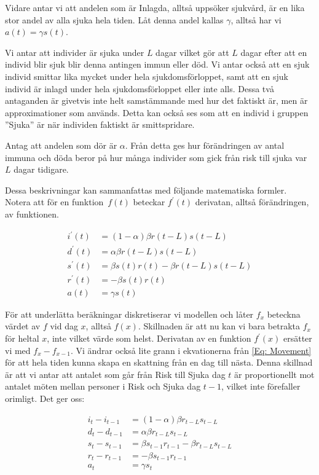 \documentclass[a4paper, 12pt]{article}
\theoremstyle{definition}
\begin{document}
Vidare antar vi att andelen som är Inlagda, alltså uppsöker sjukvård, är en lika stor andel av alla sjuka hela tiden. Låt denna andel kallas $\gamma$, alltså har vi $a(t)=\gamma s(t)$.

Vi antar att individer är sjuka under $L$ dagar vilket gör att $L$ dagar efter att en individ blir sjuk blir denna antingen immun eller död. Vi antar också att en sjuk individ smittar lika mycket under hela sjukdomsförloppet, samt att en sjuk individ är inlagd under hela sjukdomsförloppet eller inte alls. Dessa två antaganden är givetvis inte helt samstämmande med hur det faktiskt är, men är approximationer som används. Detta kan också ses som att en individ i gruppen ''Sjuka'' är när individen faktiskt är smittspridare.

Antag att andelen som dör är $\alpha$. Från detta ges hur förändringen av antal immuna och döda beror på hur många individer som gick från risk till sjuka var $L$ dagar tidigare.

Dessa beskrivningar kan sammanfattas med följande matematiska formler. Notera att för en funktion $f(t)$ beteckar $f^\prime(t)$ derivatan, alltså förändringen, av funktionen.

\begin{align}\label{Eq: Movement}
  i^\prime(t) &= (1-\alpha)\beta r(t-L)s(t-L) \\
  d^\prime(t) &= \alpha\beta r(t-L)s(t-L) \\
  s^\prime(t) &= \beta s(t)r(t) - \beta r(t-L)s(t-L) \\
  r^\prime(t) &= -\beta s(t)r(t)\\
  a(t) &= \gamma s(t)
\end{align}

För att underlätta beräkningar diskretiserar vi modellen och låter $f_x$ beteckna värdet av $f$ vid dag $x$, alltså $f(x)$. Skillnaden är att nu kan vi bara betrakta $f_x$ för heltal $x$, inte vilket värde som helst. Derivatan av en funktion $f^\prime(x)$ ersätter vi med $f_x-f_{x-1}$. Vi ändrar också lite grann i ekvationerna från \ref{Eq: Movement} för att hela tiden kunna skapa en skattning från en dag till nästa. Denna skillnad är att vi antar att antalet som går från Risk till Sjuka dag $t$ är proportionellt mot antalet möten mellan personer i Risk och Sjuka dag $t-1$, vilket inte förefaller orimligt. Det ger oss:

\begin{align}\label{Eq: Movement Diskret}
  i_t-i_{t-1} &= (1-\alpha)\beta r_{t-L}s_{t-L} \\
  d_t-d_{t-1} &= \alpha\beta r_{t-L}s_{t-L} \\
  s_t-s_{t-1} &= \beta s_{t-1}r_{t-1} - \beta r_{t-L}s_{t-L} \\
  r_t-r_{t-1} &= -\beta s_{t-1}r_{t-1}\\
  a_t &= \gamma s_t
\end{align}
\end{document}
